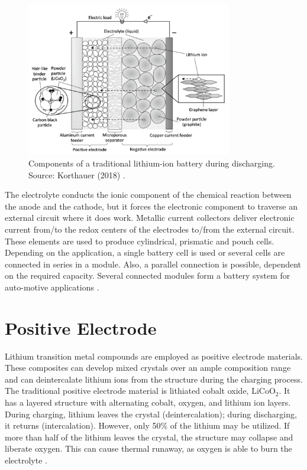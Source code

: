 \begin{figure}
    \centering
    \includegraphics[width=0.8\textwidth]{Images/Chapter1/overview.png}
    \caption[Components of a traditional lithium-ion battery during discharging]{Components of a traditional lithium-ion battery during discharging. Source: Korthauer (2018) \cite{korthauer2018lithium}.}
    \label{fig:lib-overview}
\end{figure}

The electrolyte conducts the ionic component of the chemical reaction between the anode and the cathode, but it forces the electronic component to traverse an external circuit where it does work. Metallic current collectors deliver electronic current from/to the redox centers of the electrodes to/from the external circuit. These elements are used to produce cylindrical, prismatic and pouch cells. Depending on the application, a single battery cell is used or several cells are connected in series in a module. Also, a parallel connection is possible, dependent on the required capacity. Several connected modules form a battery system for auto-motive applications \cite{korthauer2018lithium,goodenough2013li}.

\section{Positive Electrode}
\label{sec:positive-electrode}
Lithium transition metal compounds are employed as positive electrode materials. These composites can develop mixed crystals over an ample composition range and can deintercalate lithium ions from the structure during the charging process. The traditional positive electrode material is lithiated cobalt oxide, LiCoO$_2$. It has a layered structure with alternating cobalt, oxygen, and lithium ion layers. During charging, lithium leaves the crystal (deintercalation); during discharging, it returns (intercalation). However, only 50\% of the lithium may be utilized. If more than half of the lithium leaves the crystal, the structure may collapse and liberate oxygen. This can cause thermal runaway, as oxygen is able to burn the electrolyte \cite{korthauer2018lithium,manthiram2020reflection}. 

